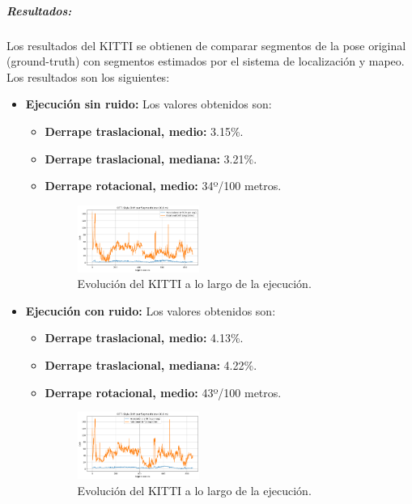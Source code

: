 \documentclass[12pt, a4paper, twoside]{article}
\begin{document}
\subparagraph{Resultados:}
Los resultados del KITTI\cite{Geiger2013KITTI} se obtienen de comparar segmentos de la pose original (ground-truth) con segmentos estimados por el sistema de localización y mapeo. 
Los resultados son los siguientes:
\begin{itemize}
  \item \textbf{Ejecución sin ruido:} Los valores obtenidos son:
  \begin{itemize}
    \item \textbf{Derrape traslacional, medio:} 3.15\%.
    \item \textbf{Derrape traslacional, mediana:} 3.21\%.
    \item \textbf{Derrape rotacional, medio:} 34º/100 metros.
    \begin{figure}[h]
      \centering
        \includegraphics[width=0.4\textwidth]{kitty_clean.png}
      \caption{Evolución del KITTI\cite{Geiger2013KITTI} a lo largo de la ejecución.}
    \end{figure} 
    \end{itemize}
  \item \textbf{Ejecución con ruido:} Los valores obtenidos son:
  \begin{itemize}
    \item \textbf{Derrape traslacional, medio:} 4.13\%.
    \item \textbf{Derrape traslacional, mediana:} 4.22\%.
    \item \textbf{Derrape rotacional, medio:} 43º/100 metros.
    \begin{figure}[h]
      \centering
        \includegraphics[width=0.4\textwidth]{kitty_noisy.png}
      \caption{Evolución del KITTI\cite{Geiger2013KITTI} a lo largo de la ejecución.}
    \end{figure} 
  \end{itemize}
\end{itemize}
\end{document}
